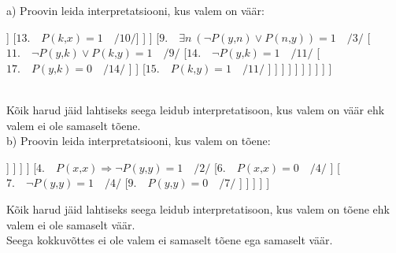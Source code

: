 \documentclass{article}
\begin{document}
a) Proovin leida interpretatsiooni, kus valem on väär:\\
\begin{forest}
	[$1.\quad \forall x\ \exists y\ (\neg P(x\text{,}y)\vee P(y\text{,}x))\Rightarrow(P(x\text{,}x)\Rightarrow\neg P(y\text{,}y))\mathrel{=}0$
	[$2.\quad \forall m\ \exists n\ (\neg P(m\text{,}n)\vee P(n\text{,}m))\Rightarrow(P(x\text{,}x)\Rightarrow\neg P(y\text{,}y))\mathrel{=}0\quad /1/$
		[$3.\quad\forall m\ \exists n\ (\neg P(m\text{,}n)\vee P(n\text{,}m))\mathrel{=}1\quad /2/$
			[$4.\quad P(x\text{,}x)\Rightarrow\neg P(y\text{,}y)\mathrel{=}0\quad /2/$
				[$5.\quad P(x\text{,}x)\mathrel{=}1\quad /4/ $
					[$6.\quad \neg P(y\text{,}y)\mathrel{=}0\quad /4/ $
						[$7.\quad P(y\text{,}y)\mathrel{=}1\quad /6/ $
							[$8.\quad \exists n\ (\neg P(x\text{,}n)\vee P(n\text{,}x))\mathrel{=}1\quad /3/ $
								[$10.\quad \neg P(x\text{,}k)\vee P(k\text{,}x)\mathrel{=}1\quad /8/ $
									[$12.\quad \neg P(x\text{,}k)\mathrel{=}1\quad /10/ $
										[$16.\quad P(x\text{,}k)\mathrel{=}0\quad /12/ $
										]
									]							
									[$13.\quad P(k\text{,}x)\mathrel{=}1\quad /10/ $]
								]
							]
							[$9.\quad \exists n\ (\neg P(y\text{,}n)\vee P(n\text{,}y))\mathrel{=}1\quad /3/ $
								[$11.\quad \neg P(y\text{,}k)\vee P(k\text{,}y)\mathrel{=}1\quad /9/ $
									[$14.\quad \neg P(y\text{,}k)\mathrel{=}1\quad /11/ $
										[$17.\quad P(y\text{,}k)\mathrel{=}0\quad /14/ $
										]
									]
									[$15.\quad P(k\text{,}y)\mathrel{=}1\quad /11/ $
									]
								]
							]
						]
					]
				]
			]
		]
	]
	]
\end{forest}\\
Kõik harud jäid lahtiseks seega leidub interpretatisoon, kus valem on väär ehk valem ei ole samaselt tõene.\\
b) Proovin leida interpretatsiooni, kus valem on tõene:\\
\begin{forest}
	[$1.\quad \forall x\ \exists y\ (\neg P(x\text{,}y)\vee P(y\text{,}x))\Rightarrow(P(x\text{,}x)\Rightarrow\neg P(y\text{,}y))\mathrel{=}1$
		[$2.\quad \forall m\ \exists n\ (\neg P(m\text{,}n)\vee P(n\text{,}m))\Rightarrow(P(x\text{,}x)\Rightarrow\neg P(y\text{,}y))\mathrel{=}1\quad /1/$
			[$3.\quad\forall m\ \exists n\ (\neg P(m\text{,}n)\vee P(n\text{,}m))\mathrel{=}0\quad /2/$
				[$5.\quad\exists n\ (\neg P(k\text{,}n)\vee P(n\text{,}k))\mathrel{=}0\quad /3/$
					[$8.\quad\forall n\ (P(k\text{,}n)\& \neg P(n\text{,}k))\mathrel{=}1\quad /5/$
						[$10.\quad\forall n\ P(k\text{,}n)\ \&\ \forall n\ \neg P(n\text{,}k)\mathrel{=}1\quad /8/$
							[$11.\quad\forall n\ P(k\text{,}n)\mathrel{=}1\quad /10/$
							]
							[$12.\quad\forall n\ \neg P(n\text{,}k)\mathrel{=}1\quad /10/$
							]
						]
					]
				]
			]
			[$4.\quad P(x\text{,}x)\Rightarrow\neg P(y\text{,}y)\mathrel{=}1\quad /2/$
				[$6.\quad P(x\text{,}x)\mathrel{=}0\quad /4/$
				]
				[$7.\quad \neg P(y\text{,}y)\mathrel{=}1\quad /4/$
					[$9.\quad P(y\text{,}y)\mathrel{=}0\quad /7/$
					]
				]
			]
		]
	]
\end{forest}
Kõik harud jäid lahtiseks seega leidub interpretatisoon, kus valem on tõene ehk valem ei ole samaselt väär.\\
Seega kokkuvõttes ei ole valem ei samaselt tõene ega samaselt väär.
\end{document}
